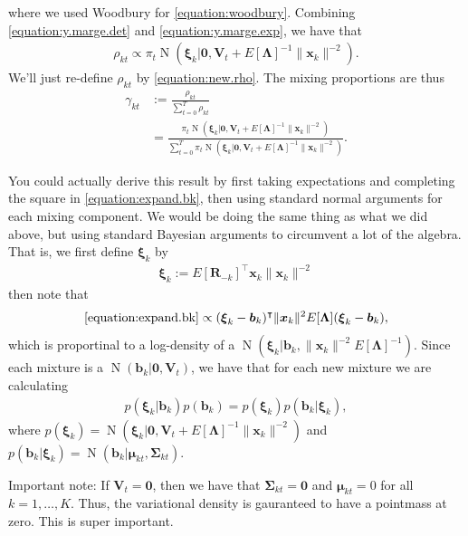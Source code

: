 \documentclass[11pt,authoryear]{article}
\DeclareMathOperator*{\N}{N}
\newcommand{\bs}[1]{\boldsymbol{#1}}
\begin{document}
where we used Woodbury for \eqref{equation:woodbury}. Combining
\eqref{equation:y.marge.det} and \eqref{equation:y.marge.exp}, we have that
\begin{align}
\label{equation:new.rho}
\rho_{kt} \propto \pi_t\N(\bs{\xi}_k|\bs{0}, \bs{V}_t + E\left[\bs{\Lambda}\right]^{-1}\|\bs{x}_k\|^{-2}).
\end{align}
We'll just re-define $\rho_{kt}$ by \eqref{equation:new.rho}. The mixing proportions are thus
\begin{align}
\label{equation:gammakt}\gamma_{kt} &:= \frac{\rho_{kt}}{\sum_{t = 0}^T\rho_{kt}}\\
&=\frac{\pi_t\N(\bs{\xi}_k|\bs{0}, \bs{V}_t + E\left[\bs{\Lambda}\right]^{-1}\|\bs{x}_k\|^{-2})}{\sum_{t = 0}^T\pi_t\N(\bs{\xi}_k|\bs{0}, \bs{V}_t + E\left[\bs{\Lambda}\right]^{-1}\|\bs{x}_k\|^{-2})}.
\end{align}


You could actually derive this result by first taking expectations and
completing the square in \eqref{equation:expand.bk}, then using standard normal
arguments for each mixing component. We would be doing the same thing as what we did above, but using standard Bayesian arguments to circumvent a lot of the algebra. That is, we first define $\bs{\xi}_k$ by
\begin{align}
\bs{\xi}_k := E\left[\bs{R}_{-k}\right]^{\intercal}\bs{x}_k\|\bs{x}_k\|^{-2}
\end{align}
then note that
\begin{align}
\eqref{equation:expand.bk} \propto (\bs{\xi}_k - \bs{b}_k)^{\intercal}\|\bs{x}_k\|^{2}E[\bs{\Lambda}](\bs{\xi}_k - \bs{b}_k),
\end{align}
which is proportinal to a log-density of a $\N(\bs{\xi}_k|\bs{b}_k,\|\bs{x}_k\|^{-2}E[\bs{\Lambda}]^{-1})$. Since each mixture is a $\N(\bs{b}_k|\bs{0}, \bs{V}_t)$, we have that for each new mixture we are calculating
\begin{align}
p(\bs{\xi}_k|\bs{b}_k)p(\bs{b}_k) = p(\bs{\xi}_k)p(\bs{b}_k|\bs{\xi}_k),
\end{align}
where $p(\bs{\xi}_k) = \N(\bs{\xi}_k|\bs{0}, \bs{V}_t +
E\left[\bs{\Lambda}\right]^{-1}\|\bs{x}_k\|^{-2})$ and
$p(\bs{b}_k|\bs{\xi}_k) = \N(\bs{b}_k|\bs{\mu}_{kt},
\bs{\Sigma}_{kt})$.

Important note: If $\bs{V}_t = \bs{0}$, then we have that
$\bs{\Sigma}_{kt} = \bs{0}$ and $\bs{\mu}_{kt} = 0$ for all $k =
1,\ldots,K$. Thus, the variational density is gauranteed to have a
pointmass at zero. This is super important.
\end{document}
